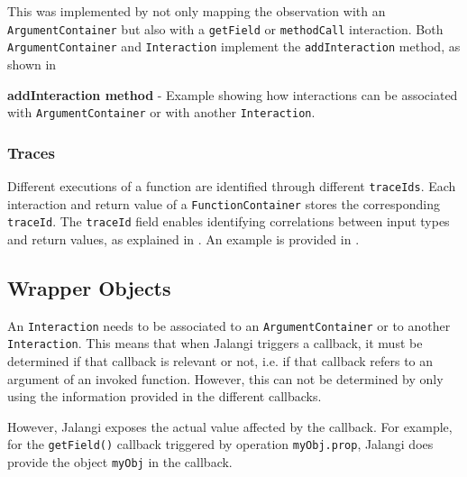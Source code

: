 This was implemented by not only mapping the observation with an \texttt{ArgumentContainer} but also with a \texttt{getField} or \texttt{methodCall} interaction. Both \texttt{ArgumentContainer} and \texttt{Interaction} implement the \texttt{addInteraction} method, as shown in 

\begin{code}
  \caption[addInteraction method]{\textbf{addInteraction method} - Example showing how interactions can be associated with \texttt{ArgumentContainer} or with another \texttt{Interaction}.}
  \label{code:add-interaction-example}
\end{code}



\subsubsection{Traces}
Different executions of a function are identified through different \texttt{traceIds}. Each interaction and return value of a \texttt{FunctionContainer} stores the corresponding \texttt{traceId}. The \texttt{traceId} field enables identifying correlations between input types and return values, as explained in . An example is provided in .




\subsection{Wrapper Objects} \label{sec:run-time-wrapper-objects}
An \texttt{Interaction} needs to be associated to an \texttt{ArgumentContainer} or to another \texttt{Interaction}. This means that when Jalangi triggers a callback, it must be determined if that callback is relevant or not, i.e. if that callback refers to an argument of an invoked function. However, this can not be determined by only using the information provided in the different callbacks.

However, Jalangi exposes the actual value affected by the callback. For example, for the \texttt{getField()} callback triggered by operation \texttt{myObj.prop}, Jalangi does provide the object \texttt{myObj} in the callback.

